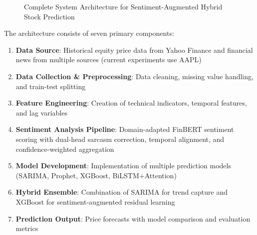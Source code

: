 \begin{figure}[htbp]
{
    }
    \caption{Complete System Architecture for Sentiment-Augmented Hybrid Stock Prediction}
    \label{fig:system_architecture}
\end{figure}

The architecture consists of seven primary components:

\begin{enumerate}
    \item \textbf{Data Source}: Historical equity price data from Yahoo Finance and financial news from multiple sources (current experiments use AAPL)
    \item \textbf{Data Collection \& Preprocessing}: Data cleaning, missing value handling, and train-test splitting
    \item \textbf{Feature Engineering}: Creation of technical indicators, temporal features, and lag variables
    \item \textbf{Sentiment Analysis Pipeline}: Domain-adapted FinBERT sentiment scoring with dual-head sarcasm correction, temporal alignment, and confidence-weighted aggregation
    \item \textbf{Model Development}: Implementation of multiple prediction models (SARIMA, Prophet, XGBoost, BiLSTM+Attention)
    \item \textbf{Hybrid Ensemble}: Combination of SARIMA for trend capture and XGBoost for sentiment-augmented residual learning
    \item \textbf{Prediction Output}: Price forecasts with model comparison and evaluation metrics
\end{enumerate}

